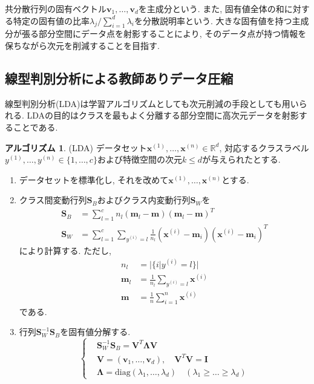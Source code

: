 \documentclass[uplatex]{jsarticle}
\theoremstyle{definition}
\newtheorem{algorithm}[definition]{アルゴリズム}
\numberwithin{equation}{section}
\newcommand{\R}{\mathbb{R}}
\begin{document}
共分散行列の固有ベクトル$\bm{v}_{1}, \dots, \bm{v}_{d}$を主成分という.
また, 固有値全体の和に対する特定の固有値の比率$\lambda_{j}/\sum_{i = 1}^{d} \lambda_{i}$を分散説明率という.
大きな固有値を持つ主成分が張る部分空間にデータ点を射影することにより, そのデータ点が持つ情報を保ちながら次元を削減することを目指す.

\subsection{線型判別分析による教師ありデータ圧縮}
線型判別分析(LDA)は学習アルゴリズムとしても次元削減の手段としても用いられる.
LDAの目的はクラスを最もよく分離する部分空間に高次元データを射影することである.
\begin{algorithm}
    (LDA)
    データセット$\bm{x}^{(1)}, \dots, \bm{x}^{(n)} \in \R^{d}$, 対応するクラスラベル$y^{(1)}, \dots, y^{(n)} \in \{1, \dots, c\}$および特徴空間の次元$k \leq d$が与えられたとする.
    \begin{enumerate}
        \item
        データセットを標準化し, それを改めて$\bm{x}^{(1)}, \dots, \bm{x}^{(n)}$とする.

        \item
        クラス間変動行列$\bm{S}_{B}$およびクラス内変動行列$\bm{S}_{W}$を
        \begin{align}
            \bm{S}_{B} &= \sum_{l = 1}^{c}n_{l}(\bm{m}_{l} - \bm{m})(\bm{m}_{l} - \bm{m})^{T} \\
            \bm{S}_{W} &= \sum_{l = 1}^{c}\sum_{y^{(i)} = l}\frac{1}{n_{l}}(\bm{x}^{(i)} - \bm{m}_{i})(\bm{x}^{(i)} - \bm{m}_{i})^{T}
        \end{align}
        により計算する.
        ただし, 
        \begin{align}
            n_{l} &= |\{i | y^{(i)} = l\}| \\
            \bm{m}_{l} &= \frac{1}{n_{l}}\sum_{y^{(i)} = l} \bm{x}^{(i)} \\
            \bm{m} &= \frac{1}{n}\sum_{i = 1}^{n} \bm{x}^{(i)}
        \end{align}
        である.

        \item
        行列$\bm{S}_{W}^{-1}\bm{S}_{B}$を固有値分解する.
        \begin{equation}
            \left\{
            \begin{aligned}
                &\bm{S}_{W}^{-1}\bm{S}_{B} = \bm{V}^{T}\bm{\Lambda}\bm{V} \\
                &\bm{V} = (\bm{v}_{1}, \dots, \bm{v}_{d}), \quad \bm{V}^{T}\bm{V} = \bm{I} \\
                &\bm{\Lambda} = \mathrm{diag}(\lambda_{1}, \dots, \lambda_{d}) \quad (\lambda_{1} \geq \dots \geq \lambda_{d})
            \end{aligned}
            \right.
        \end{equation}


\end{enumerate}
\end{algorithm}
\end{document}
